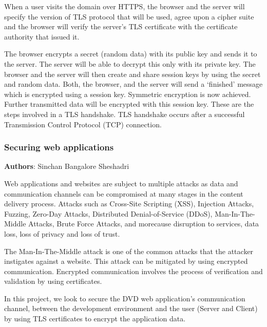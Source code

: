 When a user visits the domain over HTTPS, the browser and the server will specify the version of TLS protocol that will be used, agree upon a cipher suite and the browser will verify the server’s TLS certificate with the certificate authority that issued it.

The browser encrypts a secret (random data) with its public key and sends it to the server. The server will be able to decrypt this only with its private key. The browser and the server will then create and share session keys by using the secret and random data. Both, the browser, and the server will send a ‘finished’ message which is encrypted using a session key. Symmetric encryption is now achieved. Further transmitted data will be encrypted with this session key. These are the steps involved in a TLS handshake. TLS handshake occurs after a successful Transmission Control Protocol (TCP) connection.



\subsubsection{Securing web applications}
\textbf{Authors}: Sinchan Bangalore Sheshadri

Web applications and websites are subject to multiple attacks as data and communication channels can be compromised at many stages in the content delivery process. Attacks such as Cross-Site Scripting (XSS), Injection Attacks, Fuzzing, Zero-Day Attacks, Distributed Denial-of-Service (DDoS), Man-In-The-Middle Attacks, Brute Force Attacks, and more\footnotemark \space cause disruption to services, data loss, loss of privacy and loss of trust.

The Man-In-The-Middle attack is one of the common attacks that the attacker instigates against a website. This attack can be mitigated by using encrypted communication. Encrypted communication involves the process of verification and validation by using certificates.

In this project, we look to secure the DVD web application’s communication channel, between the development environment and the user (Server and Client) by using TLS certificates to encrypt the application data.



